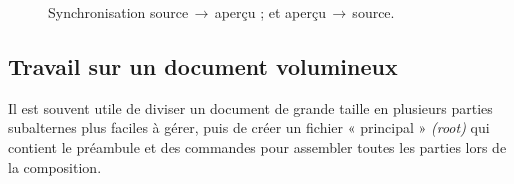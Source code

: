 \documentclass[11pt,french]{article}
\newcommand{\To}{\,\(\to\)\,}
\begin{document}
\begin{figure}
\centering
{}%
\hfill%
%
\caption[Source/Preview Synch.]{
 Synchronisation source\To aperçu ; et
 aperçu\To source.}
\label{SourcePreviewSync}
\end{figure}

\subsection{Travail sur un document volumineux}

Il est souvent utile de diviser un document de grande taille en plusieurs parties subalternes plus faciles à gérer, puis de créer un fichier « principal » \emph{(root)} qui contient le préambule et des commandes \verb|| pour assembler toutes les parties lors de la composition.
\end{document}
